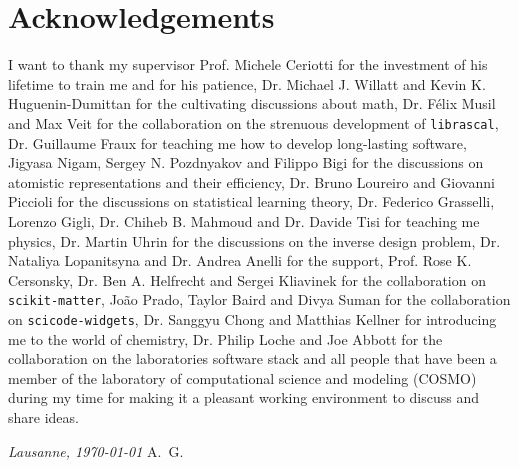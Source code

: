 \chapter*{Acknowledgements}
I want to thank my supervisor Prof. Michele Ceriotti for the investment of his lifetime to train me and for his patience, 
Dr. Michael J. Willatt and Kevin K. Huguenin-Dumittan for the cultivating discussions about math, Dr. Félix Musil and Max Veit for the collaboration on the strenuous development of \texttt{librascal}, Dr. Guillaume Fraux for teaching me how to develop long-lasting software, Jigyasa Nigam, Sergey N. Pozdnyakov and Filippo Bigi for the discussions on atomistic representations and their efficiency, Dr. Bruno Loureiro and Giovanni Piccioli for the discussions on statistical learning theory, Dr. Federico Grasselli, Lorenzo Gigli, Dr. Chiheb B. Mahmoud and Dr. Davide Tisi for teaching me physics, Dr. Martin Uhrin for the discussions on the inverse design problem, Dr. Nataliya Lopanitsyna and Dr. Andrea Anelli for the support, Prof. Rose K. Cersonsky, Dr. Ben A. Helfrecht and Sergei Kliavinek for the collaboration on \texttt{scikit-matter}, João Prado, Taylor Baird and Divya Suman for the collaboration on \texttt{scicode-widgets}, Dr. Sanggyu Chong and Matthias Kellner for introducing me to the world of chemistry, Dr. Philip Loche and Joe Abbott for the collaboration on the laboratories software stack and all people that have been a member of the laboratory of computational science and modeling (COSMO) during my time for making it a pleasant working environment to discuss and share ideas.

%
%
%
%

\bigskip
 
\noindent\textit{Lausanne, \today}
\hfill A.~G.
